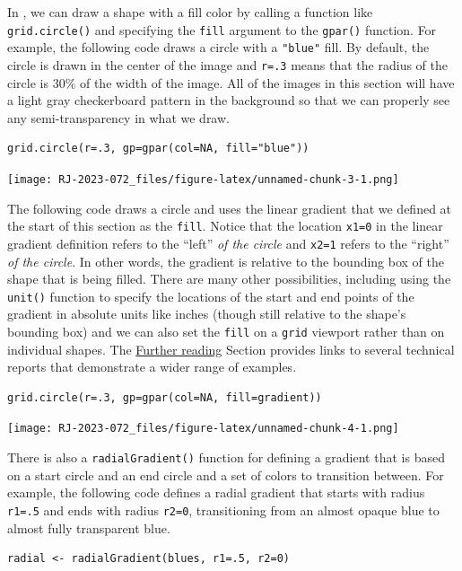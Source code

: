 In , we can draw a shape with a fill color by calling
a function like \texttt{grid.circle()} and specifying
the \texttt{fill} argument to the \texttt{gpar()} function.
For example, the following code draws a circle with a \texttt{"blue"} fill.
By default, the circle is drawn in the center of the image and
\texttt{r=.3} means that the radius of the circle is 30\% of the width
of the image.
All of the images in this section will
have a light gray checkerboard pattern in the background
so that we can properly see any semi-transparency
in what we draw.

\begin{verbatim}
grid.circle(r=.3, gp=gpar(col=NA, fill="blue"))
\end{verbatim}

\texttt{[image: RJ-2023-072\_files/figure-latex/unnamed-chunk-3-1.png]}

The following code draws a circle and uses the linear gradient that we
defined at the start of this section as the \texttt{fill}.
Notice that the location \texttt{x1=0} in the linear gradient definition
refers to the ``left'' \emph{of the circle} and
\texttt{x2=1} refers to the ``right'' \emph{of the circle}. In other
words, the gradient is relative to the bounding box of the shape
that is being filled. There are many other possibilities, including
using the \texttt{unit()} function to specify the locations of the start
and end points of the gradient in absolute units like inches
(though still relative to the shape's bounding box) and we can also set
the \texttt{fill} on a \texttt{grid} viewport rather than on individual shapes.
The \protect\hyperlink{further-reading}{Further reading} Section provides links
to several technical reports that demonstrate a wider range of
examples.

\begin{verbatim}
grid.circle(r=.3, gp=gpar(col=NA, fill=gradient))
\end{verbatim}

\texttt{[image: RJ-2023-072\_files/figure-latex/unnamed-chunk-4-1.png]}

There is also a \texttt{radialGradient()} function for defining a gradient
that is based on a start circle and an end circle and a set of colors
to transition between. For example, the following code
defines a radial gradient that starts with radius \texttt{r1=.5} and ends with
radius \texttt{r2=0}, transitioning from an almost opaque blue
to almost
fully transparent blue.

\begin{verbatim}
radial <- radialGradient(blues, r1=.5, r2=0)
\end{verbatim}

